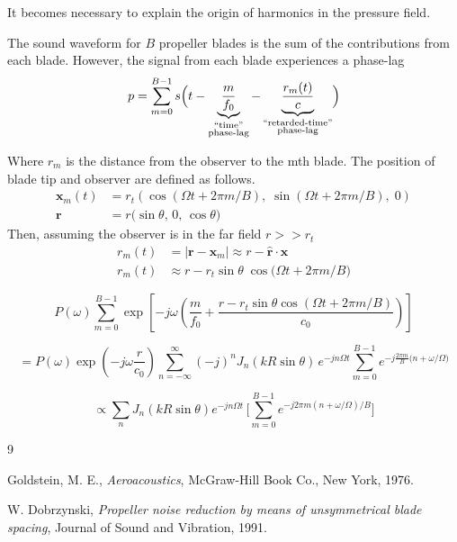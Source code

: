 \documentclass[8pt]{article}
\begin{document}
It becomes necessary to explain the origin of harmonics in the pressure field.

The sound waveform for $B$ propeller blades is the sum of the contributions from each blade.
However, the signal from each blade experiences a phase-lag 
\begin{equation}
    p = \sum_{m=0}^{B-1} s \Bigl(
      t
      - \underbrace{\frac{m}{f_0}}_{\substack{\text{“time”}\\\text{phase-lag}}}
      - \underbrace{\frac{r_m(t)}{c}}_{\substack{\text{“retarded-time”}\\\text{phase-lag}}}
    \Bigr)
\end{equation}

Where $r_m$ is the distance from the observer to the mth blade.
The position of blade tip and observer are defined as follows.
\begin{align}
    \mathbf x_m(t) &= r_t \left(\cos(\Omega t + 2\pi m/B),\;\sin(\Omega t + 2\pi m/B),\;0\right) \\
    \mathbf r &= r\bigl(\sin\theta,\,0,\,\cos\theta\bigr)
\end{align}
Then, assuming the observer is in the far field $r >> r_t$
\begin{align}
    r_m(t) &= \bigl\lvert \mathbf r - \mathbf x_m \bigr\rvert
    \approx r
    -\hat{\mathbf r}\cdot\mathbf x \\
    r_m(t) &\approx r - r_t \sin\theta\;\cos\!\bigl(\Omega t + 2\pi m/B\bigr)
\end{align}

\begin{equation}
    P(\omega) \sum_{m=0}^{B-1} \exp\!\left[-j\omega \left( \frac{m}{f_0} + \frac{r - r_t \sin\theta\cos(\Omega t + 2\pi m/B)}{c_0} \right)\right]
\end{equation}

\begin{equation}
    =P(\omega) \exp \left(-j\omega \frac{r}{c_0} \right)
  \sum_{n=-\infty}^\infty(-j)^nJ_n(kR\sin\theta)\,e^{-jn\Omega t}
  \sum_{m=0}^{B-1}e^{-j\frac{2\pi m}{B}\bigl(n+\omega/\Omega\bigr)}
\end{equation}

\begin{equation}
    \propto\sum_{n}\!J_n(kR\sin\theta)e^{-jn\Omega t}\,
    \bigl[\sum_{m=0}^{B-1}e^{-j2\pi m(n+\omega/\Omega)/B}\bigr]
\end{equation}



\begin{thebibliography}{9}

    Goldstein, M. E., 
    \emph{Aeroacoustics},
    McGraw-Hill Book Co., New York, 1976.

    W. Dobrzynski,
    \emph{Propeller noise reduction by means of unsymmetrical blade spacing},
    Journal of Sound and Vibration, 1991.


\end{thebibliography}
\end{document}
